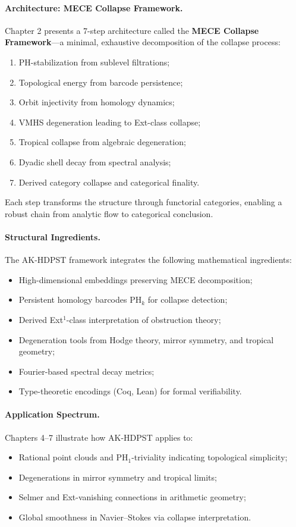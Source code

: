 \documentclass[11pt]{article}
\begin{document}
\paragraph{Architecture: MECE Collapse Framework.}
Chapter 2 presents a 7-step architecture called the \textbf{MECE Collapse Framework}—a minimal, exhaustive decomposition of the collapse process:
\begin{enumerate}
  \item PH-stabilization from sublevel filtrations;
  \item Topological energy from barcode persistence;
  \item Orbit injectivity from homology dynamics;
  \item VMHS degeneration leading to Ext-class collapse;
  \item Tropical collapse from algebraic degeneration;
  \item Dyadic shell decay from spectral analysis;
  \item Derived category collapse and categorical finality.
\end{enumerate}
Each step transforms the structure through functorial categories, enabling a robust chain from analytic flow to categorical conclusion.

\paragraph{Structural Ingredients.}
The AK-HDPST framework integrates the following mathematical ingredients:
\begin{itemize}
  \item High-dimensional embeddings preserving MECE decomposition;
  \item Persistent homology barcodes \( \mathrm{PH}_k \) for collapse detection;
  \item Derived Ext$^1$-class interpretation of obstruction theory;
  \item Degeneration tools from Hodge theory, mirror symmetry, and tropical geometry;
  \item Fourier-based spectral decay metrics;
  \item Type-theoretic encodings (Coq, Lean) for formal verifiability.
\end{itemize}

\paragraph{Application Spectrum.}
Chapters 4–7 illustrate how AK-HDPST applies to:
\begin{itemize}
  \item Rational point clouds and PH$_1$-triviality indicating topological simplicity;
  \item Degenerations in mirror symmetry and tropical limits;
  \item Selmer and Ext-vanishing connections in arithmetic geometry;
  \item Global smoothness in Navier–Stokes via collapse interpretation.
\end{itemize}
\end{document}
